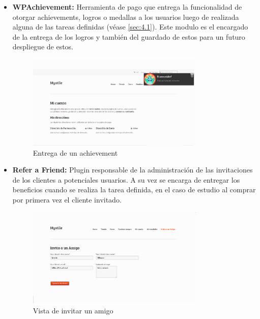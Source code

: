 \begin{itemize}


    \item {\bf WPAchievement:}
        Herramienta de pago que entrega la funcionalidad de otorgar achievements,
        logros o medallas a los usuarios luego de realizada alguna de las tareas
        definidas (véase \ref{sec:4.1}).
        Este modulo es el encargado de la entrega de los logros y también del
        guardado de estos para un futuro despliegue de estos.


\begin{figure}[!htb]
  \centering
  \includegraphics[width=0.8\textwidth]{images/Nuevamedalla.png}
  \caption[achievement]{Entrega de un achievement}
  \label{fig:Players}
\end{figure}

    \item {\bf Refer a Friend:}
        Plugin responsable de la administración de las invitaciones de los
        clientes a potenciales usuarios.
        A su vez se encarga de entregar los beneficios cuando se realiza la tarea
        definida, en el caso de estudio al comprar por primera vez el cliente
        invitado.


\begin{figure}[!htb]
  \centering
  \includegraphics[width=0.8\textwidth]{images/invitaunamigo.png}
  \caption[invitar]{Vista de invitar un amigo}
  \label{fig:Players}
\end{figure}

\end{itemize}

